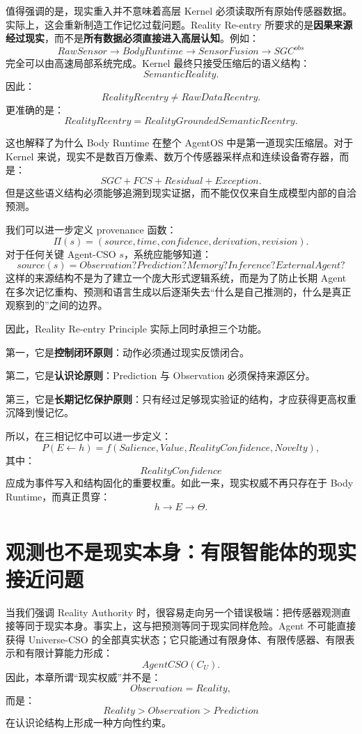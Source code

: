 值得强调的是，现实重入并不意味着高层 Kernel 必须读取所有原始传感器数据。实际上，这会重新制造工作记忆过载问题。Reality Re-entry 所要求的是\textbf{因果来源经过现实}，而不是\textbf{所有数据必须直接进入高层认知}。例如：
\[
RawSensor
\rightarrow
BodyRuntime
\rightarrow
SensorFusion
\rightarrow
SGC^{obs}
\]
完全可以由高速局部系统完成。Kernel 最终只接受压缩后的语义结构：
\[
SemanticReality.
\]
因此：
\[
RealityReentry
\neq
RawDataReentry.
\]
更准确的是：
\[
\boxed{
RealityReentry
=
RealityGroundedSemanticReentry.
}
\]

这也解释了为什么 Body Runtime 在整个 AgentOS 中是第一道现实压缩层。对于 Kernel 来说，现实不是数百万像素、数万个传感器采样点和连续设备寄存器，而是：
\[
SGC+FCS+Residual+Exception.
\]
但是这些语义结构必须能够追溯到现实证据，而不能仅仅来自生成模型内部的自洽预测。

我们可以进一步定义 provenance 函数：
\[
\Pi(s)
=
\left(
source,
time,
confidence,
derivation,
revision
\right).
\]
对于任何关键 Agent-CSO $s$，系统应能够知道：
\[
source(s)
=
Observation?
Prediction?
Memory?
Inference?
ExternalAgent?
\]
这样的来源结构不是为了建立一个庞大形式逻辑系统，而是为了防止长期 Agent 在多次记忆重构、预测和语言生成以后逐渐失去``什么是自己推测的，什么是真正观察到的''之间的边界。

因此，Reality Re-entry Principle 实际上同时承担三个功能。

第一，它是\textbf{控制闭环原则}：动作必须通过现实反馈闭合。

第二，它是\textbf{认识论原则}：Prediction 与 Observation 必须保持来源区分。

第三，它是\textbf{长期记忆保护原则}：只有经过足够现实验证的结构，才应获得更高权重沉降到慢记忆。

所以，在三相记忆中可以进一步定义：
\[
P(E\leftarrow h)
=
f(
Salience,
Value,
RealityConfidence,
Novelty
),
\]
其中：
\[
RealityConfidence
\]
应成为事件写入和结构固化的重要权重。如此一来，现实权威不再只存在于 Body Runtime，而真正贯穿：
\[
h\rightarrow E\rightarrow\Theta.
\]

\section{观测也不是现实本身：有限智能体的现实接近问题}

当我们强调 Reality Authority 时，很容易走向另一个错误极端：把传感器观测直接等同于现实本身。事实上，这与把预测等同于现实同样危险。Agent 不可能直接获得 Universe-CSO 的全部真实状态；它只能通过有限身体、有限传感器、有限表示和有限计算能力形成：
\[
AgentCSO(C_U).
\]
因此，本章所谓``现实权威''并不是：
\[
Observation=Reality,
\]
而是：
\[
\boxed{
Reality
>
Observation
>
Prediction
}
\]
在认识论结构上形成一种方向性约束。

